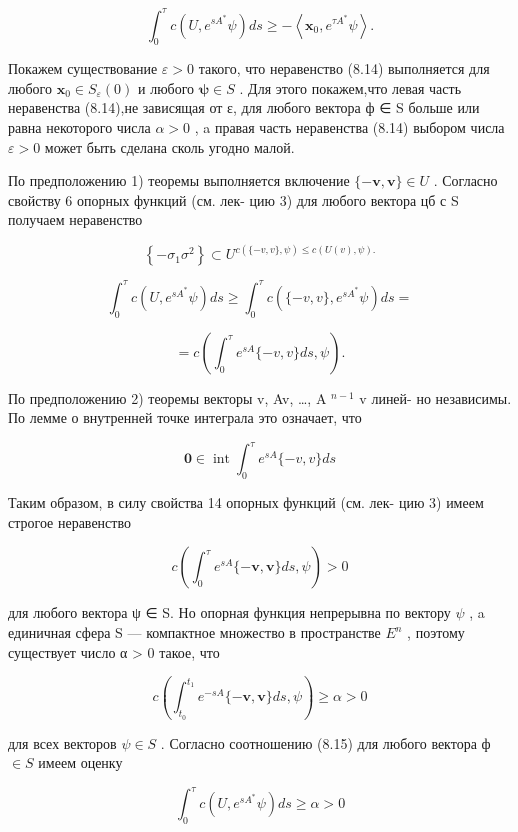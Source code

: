 \documentclass[8pt]{extarticle}
\begin{document}
\[
{\int }_{0}^{\tau }c\left( {U,{e}^{s{A}^{ * }}\psi }\right) {ds} \geq   - \left\langle  {{\mathbf{x}}_{0},{e}^{\tau {A}^{ * }}\psi }\right\rangle  . \tag{8.14}
\]

Покажем существование \(\varepsilon  > 0\) такого, что неравенство (8.14) выполняется для любого \({\mathbf{x}}_{0} \in  {S}_{\varepsilon }\left( 0\right)\) и любого \(\mathbf{\psi } \in  S\) . Для этого покажем,что левая часть неравенства (8.14),не зависящая от ε, для любого вектора ф ∈ S больше или равна некоторого числа \(\alpha  > 0\) , a правая часть неравенства (8.14) выбором числа \(\varepsilon  > 0\) может быть сделана сколь угодно малой.

По предположению 1) теоремы выполняется включение \(\{  - \mathbf{v},\mathbf{v}\}  \in  U\) . Согласно свойству 6 опорных функций (см. лек- цию 3) для любого вектора цб с S получаем неравенство

\[
\left\{  {-{\sigma }_{1}{\sigma }^{2}}\right\}   \subset  {U}^{c\left( {\{  - v,v\} ,\psi }\right)  \leq  c\left( {U\left( v\right) ,\psi }\right) .}
\]

\[
{\int }_{0}^{\tau }c\left( {U,{e}^{s{A}^{ * }}\psi }\right) {ds} \geq  {\int }_{0}^{\tau }c\left( {\{  - v,v\} ,{e}^{s{A}^{ * }}\psi }\right) {ds} =
\]

\[
= c\left( {{\int }_{0}^{\tau }{e}^{sA}\{  - v,v\} {ds},\psi }\right) . \tag{8.15}
\]

По предположению 2) теоремы векторы v, Av, …, A \({}^{n - 1}\) v линей- но независимы. По лемме о внутренней точке интеграла это означает, что

\[
\mathbf{0} \in  \operatorname{int}{\int }_{0}^{\tau }{e}^{sA}\{  - v,v\} {ds}
\]

Таким образом, в силу свойства 14 опорных функций (см. лек- цию 3) имеем строгое неравенство

\[
c\left( {{\int }_{0}^{\tau }{e}^{sA}\{  - \mathbf{v},\mathbf{v}\} {ds},\psi }\right)  > 0
\]

для любого вектора ψ ∈ S. Но опорная функция непрерывна по вектору \(\psi\) , a единичная сфера S — компактное множество в пространстве \({E}^{n}\) , поэтому существует число α > 0 такое, что

\[
c\left( {{\int }_{{t}_{0}}^{{t}_{1}}{e}^{-{sA}}\{  - \mathbf{v},\mathbf{v}\} {ds},\psi }\right)  \geq  \alpha  > 0
\]

для всех векторов \(\psi  \in  S\) . Согласно соотношению (8.15) для любого вектора ф \(\in  S\) имеем оценку

\[
{\int }_{0}^{\tau }c\left( {U,{e}^{s{A}^{ * }}\psi }\right) {ds} \geq  \alpha  > 0 \tag{8.16}
\]
\end{document}
